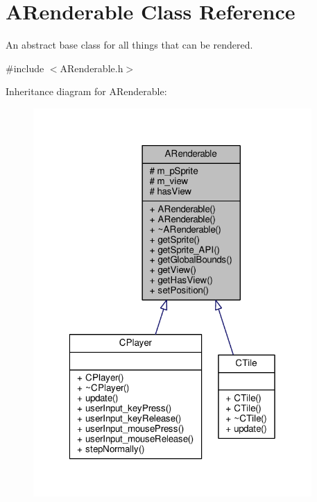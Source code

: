 \hypertarget{classARenderable}{\section{A\-Renderable Class Reference}
\label{classARenderable}
}


An abstract base class for all things that can be rendered.  




{\ttfamily \#include $<$A\-Renderable.\-h$>$}



Inheritance diagram for A\-Renderable\-:
\nopagebreak
\begin{figure}[H]
\begin{center}
\leavevmode
\includegraphics[width=301pt]{classARenderable__inherit__graph}
\end{center}
\end{figure}


